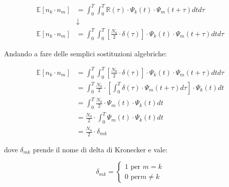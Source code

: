 {
    \Large 
    \begin{equation}
        \begin{split}
       \mathbb{E} [n_k \cdot n_m]
        &= 
        \int_{0}^{T}
        \int_{0}^{T} 
       \mathbb{R} (\tau)
        \cdot 
        \Psi_k (t)
        \cdot 
        \Psi_m (t + \tau)
        dt 
        d\tau
        \\
        &\downarrow
        \\
        \mathbb{E} [n_k \cdot n_m]
        &= 
        \int_{0}^{T}
        \int_{0}^{T} 
        \left[
        \frac{N_0}{2}
        \cdot 
        \delta (\tau)
        \right]
        \cdot 
        \Psi_k (t)
        \cdot 
        \Psi_m (t + \tau)
        dt 
        d\tau
        \end{split}
    \end{equation}
}

Andando a fare delle semplici sostituzioni algebriche: 

{
    \Large
    \begin{equation}
        \begin{split}
        \mathbb{E} [n_k \cdot n_m]
        &= 
        \int_{0}^{T}
        \int_{0}^{T} 
        \left[
        \frac{N_0}{2}
        \cdot 
        \delta (\tau)
        \right]
        \cdot 
        \Psi_k (t)
        \cdot 
        \Psi_m (t + \tau)
        dt 
        d\tau
        \\
        &= 
        \int_{0}^{T}
        \frac{N_0}{2}        
        \cdot
        \left[
        \int_{0}^{T}  
        \delta (\tau)
        \cdot 
        \Psi_m (t + \tau)
        d\tau
        \right]
        \cdot 
        \Psi_k (t)
        dt 
        \\
        &= 
        \int_{0}^{T}
        \frac{N_0}{2}        
        \cdot
        \Psi_m (t)
        \cdot 
        \Psi_k (t)
        dt 
        \\
        &=
        \frac{N_0}{2}        
        \cdot
        \int_{0}^{T}
        \Psi_m (t)
        \cdot 
        \Psi_k (t)
        dt 
        \\
        &= 
        \frac{N_0}{2}        
        \cdot
        \delta_{mk}
        \end{split}
    \end{equation}
}

dove $\delta_{mk}$ prende il nome di delta di Kronecker e vale: 

{
    \Large 
    \begin{equation}
        \delta_{mk}
        = 
        \begin{cases}
            1 \text{ per } m = k 
            \\
            0 \text{ per} m \neq k
        \end{cases}
    \end{equation}
}

